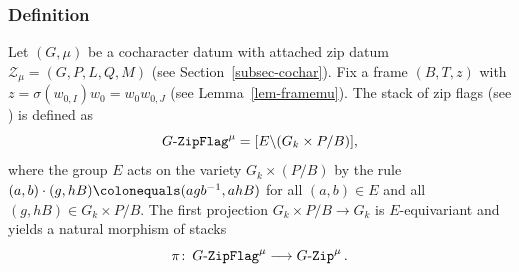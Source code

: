 \documentclass[10pt,a4paper]{article}
\numberwithin{equation}{section}
\theoremstyle{definition}
\theoremstyle{remark}
\newcommand{\GZip}{\mathop{\text{$G$-{\tt Zip}}}\nolimits}
\newcommand{\GF}{\mathop{\text{$G$-{\tt ZipFlag}}}\nolimits}
\newcommand{\Zcal}{{\mathcal Z}}
\newcommand{\lra}{\longrightarrow}
\begin{document}
\subsubsection{Definition}
Let $(G,\mu)$ be a cocharacter datum with attached zip datum $\Zcal_{\mu}=(G,P,L,Q,M)$ (see Section~\ref{subsec-cochar}). Fix a frame $(B,T,z)$ with $z=\sigma(w_{0,I})w_0=w_0w_{0,J}$ (see Lemma~\ref{lem-framemu}). The stack of zip flags (see \cite[Definition 2.1.1]{Goldring-Koskivirta-Strata-Hasse}) is defined as
\begin{equation}\label{eq-Gzipflag-PmodB}
\GF^\mu=[E\backslash (G_k \times P/B)],     
\end{equation}
where the group $E$ acts on the variety $G_k \times (P/B)$ by the rule $(a,b)\cdot (g,hB) \colonequals (agb^{-1},ahB)$ for all $(a,b)\in E$ and all $(g,hB)\in G_k \times P/B$. The first projection $G_k \times P/B \to G_k$ is $E$-equivariant and yields a natural morphism of stacks
 \begin{equation}\label{projmap-flag}
     \pi  \colon  \GF^\mu \lra \GZip^\mu.
 \end{equation}
\end{document}
